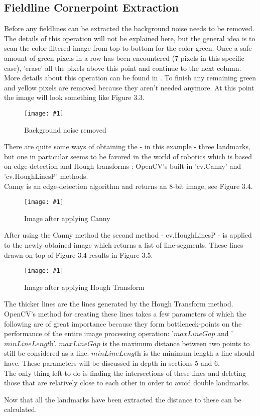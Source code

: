 \documentclass{ba-kecs}
\numberwithin{figure}{section}
\numberwithin{equation}{section}
\newcommand{\dkepic}[2]{ %
	\begin{figure}[H] %
	\texttt{[image: \#1]}
	\caption{#2}
	\label{#1}
	\end{figure}
}
\begin{document}
\subsection{Fieldline Cornerpoint Extraction}
Before any fieldlines can be extracted the background noise needs to be removed. The details of this operation will not be explained here, but the general idea is to scan the color-filtered image from top to bottom for the color green. Once a safe amount of green pixels in a row has been encountered (7 pixels in this specific case), 'erase' all the pixels above this point and continue to the next column. More details about this operation can be found in \cite{ref1}. To finish any remaining green and yellow pixels are removed because they aren't needed anymore. At this point the image will look something like Figure 3.3.\\
\dkepic{figure_IP3}{Background noise removed}
There are quite some ways of obtaining the - in this example - three landmarks, but one in particular seems to be favored in the world of robotics which is based on edge-detection and Hough transforms \cite{ref2}\cite{ref3}: OpenCV's built-in 'cv.Canny' and 'cv.HoughLinesP' methods. \\
Canny is an edge-detection algorithm and returns an 8-bit image, see Figure 3.4.\\
\dkepic{figure_IP4}{Image after applying Canny}
After using the Canny method the second method - cv.HoughLinesP - is applied to the newly obtained image which returns a list of line-segments. These lines drawn on top of Figure 3.4 results in Figure 3.5.\\
\dkepic{figure_IP5}{Image after applying Hough Transform}
The thicker lines are the lines generated by the Hough Transform method.
OpenCV's method for creating these lines takes a few parameters of which the following are of great importance because they form bottleneck-points on the performance of the entire image processing operation: '$\textit{maxLineGap}$ and '$\textit{minLineLength}$'. $\textit{maxLineGap}$ is the maximum distance between two points to still be considered as a line. $\textit{minLineLength}$ is the minimum length a line should have. These parameters will be discussed in-depth in sections 5 and 6. \\
The only thing left to do is finding the intersections of these lines and deleting those that are relatively close to each other in order to avoid double landmarks.


Now that all the landmarks have been extracted the distance to these can be calculated. 
\end{document}
